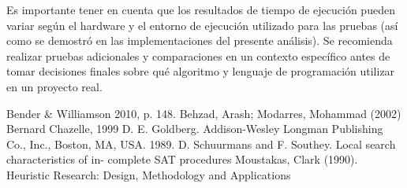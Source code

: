 \documentclass{article}
\begin{document}
Es importante tener en cuenta que los resultados de tiempo de ejecución pueden variar según el hardware y el entorno de ejecución utilizado para las pruebas (así como se demostró en las implementaciones del presente análisis). Se recomienda realizar pruebas adicionales y comparaciones en un contexto específico antes de tomar decisiones finales sobre qué algoritmo y lenguaje de programación utilizar en un proyecto real.


\begin{thebibliography}{widest entry} 
  \bibitem[1]{} Bender \& Williamson 2010, p. 148.
  \bibitem[2]{} Behzad, Arash; Modarres, Mohammad (2002)
  \bibitem[3]{} Bernard Chazelle, 1999
  \bibitem[4]{}  D. E. Goldberg. Addison-Wesley Longman Publishing Co., Inc., Boston, MA, USA. 1989. 
  \bibitem[5]{} D. Schuurmans and F. Southey. Local search characteristics of in- complete SAT procedures
  \bibitem[6]{} Moustakas, Clark (1990). Heuristic Research: Design, Methodology and Applications
 \end{thebibliography}
\end{document}
